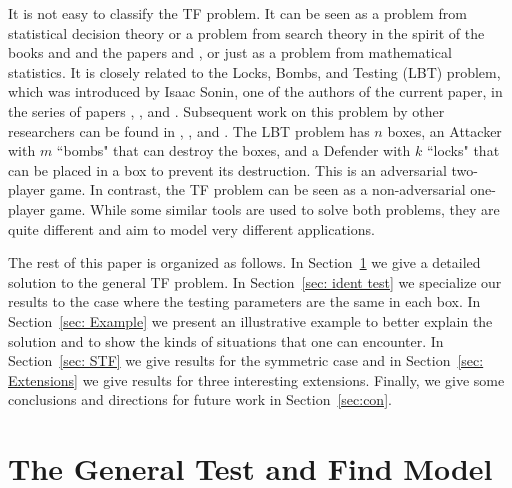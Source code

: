 \documentclass[a4paper,11pt]{article}
\begin{document}
It is not easy to classify the TF problem. It can be seen as a problem from statistical decision theory or a problem from search theory in the spirit of the books \cite{Alp13} and \cite{Gar00} and the papers \cite{Staroverov:1963} and \cite{Cla23}, or just as a problem from mathematical statistics. It is closely related to the Locks, Bombs, and Testing (LBT) problem, which was introduced by Isaac Sonin, one of the authors of the current paper, in the series of papers \cite{lison21}, \cite{son24}, and \cite{son25}. Subsequent work on this problem by other researchers can be found in \cite{Liu:Mazlov:2026}, \cite{Liu:Mazlov:2026b}, and \cite{Schreider:2026}. The LBT problem has $n$ boxes, an Attacker with $m$ ``bombs" that can destroy the boxes, and a Defender with $k$ ``locks" that can be placed in a box to prevent its destruction. This is an adversarial two-player game. In contrast, the TF problem can be seen as a non-adversarial one-player game. While some similar tools are used to solve both problems, they are quite different and aim to model very different applications.

The rest of this paper is organized as follows. In Section~\ref{sec: GTF} we give a detailed solution to the general TF problem. In Section~\ref{sec: ident test} we specialize our results to the case where the testing parameters are the same in each box. In Section~\ref{sec: Example} we present an illustrative  example to better explain  the solution and to show the kinds of situations that one can encounter. In Section~\ref{sec: STF} we give results for the symmetric case and in Section~\ref{sec: Extensions} we give results for three interesting extensions. Finally, we give some conclusions and directions for future work in Section~\ref{sec:con}. 

\section{The General Test and Find Model}\label{sec: GTF}
\end{document}
